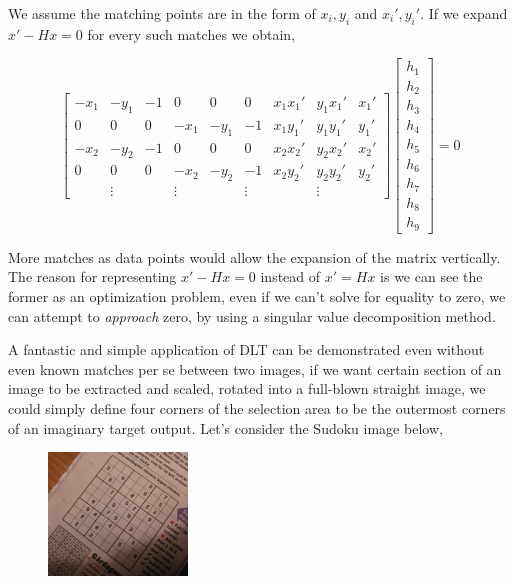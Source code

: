 \documentclass{article}
\begin{document}
We assume the matching points are in the form of $x_i,y_i$ and $x_i',y_i'$.  If
we expand $x' - Hx = 0$ for every such matches we obtain,

$$ 
\left[\begin{array}{rrrrrrrrr}
-x_1 & -y_1 & -1 & 0 & 0 & 0 & x_1x_1' & y_1x_1' & x_1' \\
0 & 0 & 0 & -x_1 & -y_1 & -1 & x_1y_1' & y_1y_1' & y_1' \\
-x_2 & -y_2 & -1 & 0 & 0 & 0 & x_2x_2' & y_2x_2' & x_2' \\
0 & 0 & 0 & -x_2 & -y_2 & -1 & x_2y_2' & y_2y_2' & y_2' \\
 &  \vdots &  &  \vdots &  & \vdots &  &  \vdots & 
\end{array}\right]
\left[\begin{array}{r}
h_1 \\ h_2 \\ h_3 \\ h_4 \\ h_5 \\ h_6 \\ h_7 \\ h_8 \\ h_9 
\end{array}\right] = 0
$$

More matches as data points would allow the expansion of the matrix vertically.
The reason for representing $x' - Hx = 0$ instead of $x'=Hx$ is we can see the
former as an optimization problem, even if we can't solve for equality to zero,
we can attempt to {\em approach} zero, by using a singular value decomposition
method.

A fantastic and simple application of DLT can be demonstrated even without even
known matches per se between two images, if we want certain section of an image
to be extracted and scaled, rotated into a full-blown straight image, we could
simply define four corners of the selection area to be the outermost corners of
an imaginary target output. Let's consider the Sudoku image below,

\begin{figure}[h]
  \centering
  \includegraphics[width=10em]{sudoku81.jpg}
\end{figure}
\end{document}
